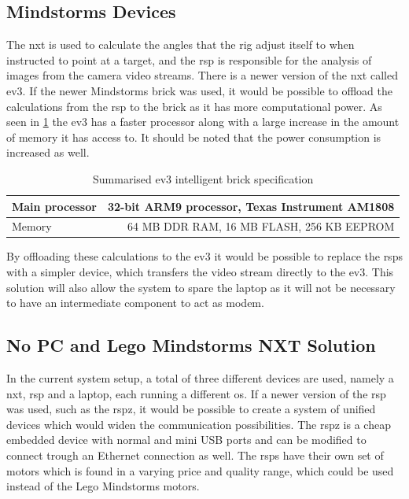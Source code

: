 \subsection{Mindstorms Devices}\label{subsec:disc_minds}
The \gls{nxt} is used to calculate the angles that the rig adjust itself to when instructed to point at a target, and the \gls{rsp} is responsible for the analysis of images from the camera video streams. There is a newer version of the nxt called \gls{ev3}. If the newer Mindstorms brick was used, it would be possible to offload the calculations from the \gls{rsp} to the brick as it has more computational power. As seen in \cref{tbl:ev3_spec} the \gls{ev3} has a faster processor along with a large increase in the amount of memory it has access to. It should be noted that the power consumption is increased as well.

\begin{table}[ht]
  \centering
  \begin{tabular}{|l|r|}
  \hline
    Main processor & 32-bit ARM9 processor, Texas Instrument AM1808\\ \hline
    Memory & 64 MB DDR RAM, 16 MB FLASH, 256 KB EEPROM\\
  \hline
  \end{tabular}
  \caption{Summarised \gls{ev3} intelligent brick specification\cite{ev3_specs}}
  \label{tbl:ev3_spec}
\end{table}

By offloading these calculations to the \gls{ev3} it would be possible to replace the \glspl{rsp} with a simpler device, which transfers the video stream directly to the \gls{ev3}. This solution will also allow the system to spare the laptop as it will not be necessary to have an intermediate component to act as modem.

\subsection{No PC and Lego Mindstorms NXT Solution}\label{subsec:disc_no_pc_lego}
In the current system setup, a total of three different devices are used, namely a \gls{nxt}, \gls{rsp} and a laptop, each running a different \gls{os}. If a newer version of the \gls{rsp} was used, such as the \gls{rspz}, it would be possible to create a system of unified devices which would widen the communication possibilities. The \gls{rspz} is a cheap embedded device with normal and mini USB ports and can be modified to connect trough an Ethernet connection as well. The \glspl{rsp} have their own set of motors which is found in a varying price and quality range, which could be used instead of the Lego Mindstorms motors.\cite{rs_pi_zero} \cite{rsp_zero_ethernet}

